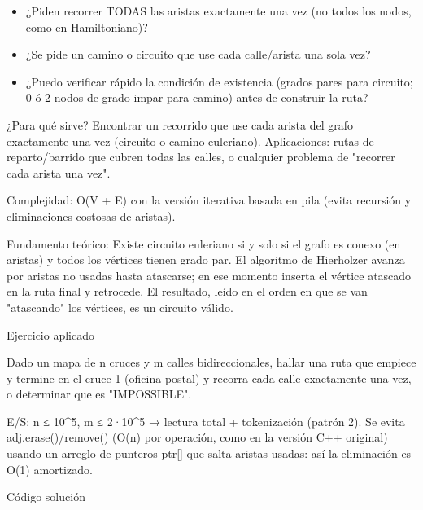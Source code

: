 \begin{itemize}
\item ¿Piden recorrer TODAS las aristas exactamente una vez (no todos los nodos, como en Hamiltoniano)?
\item ¿Se pide un camino o circuito que use cada calle/arista una sola vez?
\item ¿Puedo verificar rápido la condición de existencia (grados pares para circuito; 0 ó 2 nodos de grado impar para camino) antes de construir la ruta?
\end{itemize}

¿Para qué sirve? Encontrar un recorrido que use cada arista del grafo exactamente una vez (circuito o camino euleriano). Aplicaciones: rutas de reparto/barrido que cubren todas las calles, o cualquier problema de "recorrer cada arista una vez".

Complejidad: O(V + E) con la versión iterativa basada en pila (evita recursión y eliminaciones costosas de aristas).

Fundamento teórico: Existe circuito euleriano si y solo si el grafo es conexo (en aristas) y todos los vértices tienen grado par. El algoritmo de Hierholzer avanza por aristas no usadas hasta atascarse; en ese momento inserta el vértice atascado en la ruta final y retrocede. El resultado, leído en el orden en que se van "atascando" los vértices, es un circuito válido.

Ejercicio aplicado

Dado un mapa de n cruces y m calles bidireccionales, hallar una ruta que empiece y termine en el cruce 1 (oficina postal) y recorra cada calle exactamente una vez, o determinar que es "IMPOSSIBLE".

E/S: n ≤ 10\textasciicircum{}5, m ≤ 2·10\textasciicircum{}5 → lectura total + tokenización (patrón 2). Se evita adj.erase()/remove() (O(n) por operación, como en la versión C++ original) usando un arreglo de punteros ptr[] que salta aristas usadas: así la eliminación es O(1) amortizado.

Código solución

